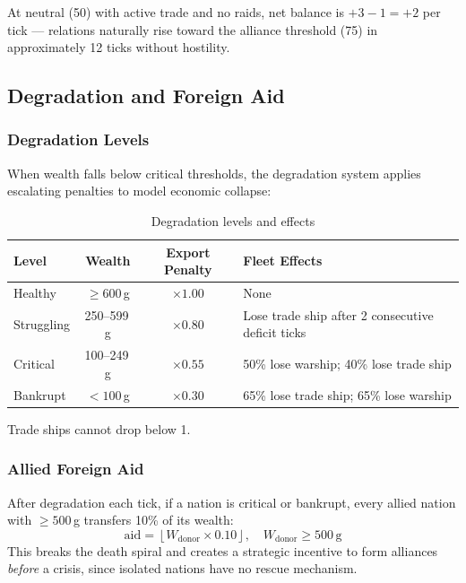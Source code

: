 \documentclass[12pt,a4paper]{article}
\begin{document}
At neutral (50) with active trade and no raids, net balance is $+3-1=+2$ per tick --- relations naturally rise toward the alliance threshold (75) in approximately 12 ticks without hostility.

\subsection{Degradation and Foreign Aid}

\subsubsection{Degradation Levels}

When wealth falls below critical thresholds, the degradation system applies escalating penalties to model economic collapse:

\begin{table}[h]
\centering
\caption{Degradation levels and effects}
\begin{tabular}{|l|c|c|p{5.5cm}|}
\hline
\textbf{Level} & \textbf{Wealth} & \textbf{Export Penalty} & \textbf{Fleet Effects} \\
\hline
Healthy    & $\geq 600$\,g   & $\times 1.00$ & None \\
Struggling & 250--599\,g     & $\times 0.80$ & Lose trade ship after 2 consecutive deficit ticks \\
Critical   & 100--249\,g     & $\times 0.55$ & 50\% lose warship; 40\% lose trade ship \\
Bankrupt   & $< 100$\,g      & $\times 0.30$ & 65\% lose trade ship; 65\% lose warship \\
\hline
\end{tabular}
\end{table}

Trade ships cannot drop below 1.

\subsubsection{Allied Foreign Aid}

After degradation each tick, if a nation is critical or bankrupt, every allied nation with $\geq 500$\,g transfers 10\% of its wealth:
\begin{equation}
    \text{aid} = \left\lfloor W_{\text{donor}} \times 0.10 \right\rfloor,
    \quad W_{\text{donor}} \geq 500\,\text{g}
\end{equation}
This breaks the death spiral and creates a strategic incentive to form alliances \textit{before} a crisis, since isolated nations have no rescue mechanism.
\end{document}
